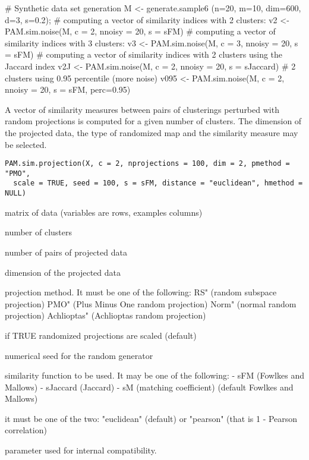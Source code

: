 \documentclass{article}
\begin{document}
\begin{Examples}
\begin{ExampleCode}
# Synthetic data set generation
M <- generate.sample6 (n=20, m=10, dim=600, d=3, s=0.2);
# computing a vector of similarity indices with 2 clusters:
v2 <- PAM.sim.noise(M, c = 2, nnoisy = 20,  s = sFM)
# computing a vector of similarity indices with 3 clusters:
v3 <- PAM.sim.noise(M, c = 3, nnoisy = 20,  s = sFM)
# computing a vector of similarity indices with 2 clusters using the Jaccard index
v2J <- PAM.sim.noise(M, c = 2, nnoisy = 20,  s = sJaccard)
# 2 clusters using 0.95 percentile (more noise)
v095 <- PAM.sim.noise(M, c = 2, nnoisy = 20,  s = sFM, perc=0.95)
\end{ExampleCode}
\end{Examples}

\begin{Description}\relax
A vector of similarity measures between pairs of clusterings perturbed with random projections is computed for a given number of clusters. 
The dimension of the projected data, the type of randomized map and the similarity measure may be selected.
\end{Description}
\begin{Usage}
\begin{verbatim}
PAM.sim.projection(X, c = 2, nprojections = 100, dim = 2, pmethod = "PMO", 
  scale = TRUE, seed = 100, s = sFM, distance = "euclidean", hmethod = NULL)
\end{verbatim}
\end{Usage}
\begin{Arguments}
\begin{ldescription}
\item[\code{X}] matrix of data (variables are rows, examples columns) 
\item[\code{c}] number of clusters 
\item[\code{nprojections}] number of pairs of projected data 
\item[\code{dim}] dimension of the projected data 
\item[\code{pmethod}] projection method. It must be one of the following:  
RS" (random subspace projection)
PMO" (Plus Minus One random projection)
Norm" (normal random projection)
Achlioptas" (Achlioptas random projection)
\item[\code{scale}] if TRUE randomized projections are scaled (default) 
\item[\code{seed}] numerical seed for the random generator 
\item[\code{s}] similarity function to be used. It may be one of the following: 
- sFM (Fowlkes and Mallows)
- sJaccard (Jaccard)
- sM (matching coefficient)
(default Fowlkes and Mallows) 
\item[\code{distance}] it must be one of the two: "euclidean" (default) or "pearson" (that is 1 - Pearson correlation)
\item[\code{hmethod}] parameter used for internal compatibility. 
\end{ldescription}
\end{Arguments}
\end{document}
